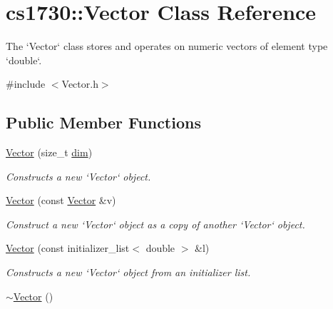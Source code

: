 \hypertarget{classcs1730_1_1Vector}{
\section{cs1730::Vector Class Reference}
\label{classcs1730_1_1Vector}
}


The `Vector` class stores and operates on numeric vectors of element type `double`.  


{\ttfamily \#include $<$Vector.h$>$}\subsection*{Public Member Functions}
\begin{DoxyCompactItemize}
\item 
\hyperlink{classcs1730_1_1Vector_a9eb37c1c544e3fa304b1a711e28b9ebe}{Vector} (size\_\-t \hyperlink{classcs1730_1_1Vector_a23747645c422e9fd5130a685d254ff09}{dim})
\begin{DoxyCompactList}\small\item\em Constructs a new `Vector` object. \item\end{DoxyCompactList}\item 
\hyperlink{classcs1730_1_1Vector_a5f04e343b7306ad11f8a82c89b486764}{Vector} (const \hyperlink{classcs1730_1_1Vector}{Vector} \&v)
\begin{DoxyCompactList}\small\item\em Construct a new `Vector` object as a copy of another `Vector` object. \item\end{DoxyCompactList}\item 
\hyperlink{classcs1730_1_1Vector_aa75cb45805c288512a0d67fef2fb210b}{Vector} (const initializer\_\-list$<$ double $>$ \&l)
\begin{DoxyCompactList}\small\item\em Constructs a new `Vector` object from an initializer list. \item\end{DoxyCompactList}\item 
\hypertarget{classcs1730_1_1Vector_a2eb3c49587a4f12cade7895ccb73f6a0}{
\hyperlink{classcs1730_1_1Vector_a2eb3c49587a4f12cade7895ccb73f6a0}{$\sim$Vector} ()}
\label{classcs1730_1_1Vector_a2eb3c49587a4f12cade7895ccb73f6a0}


\end{DoxyCompactItemize}
